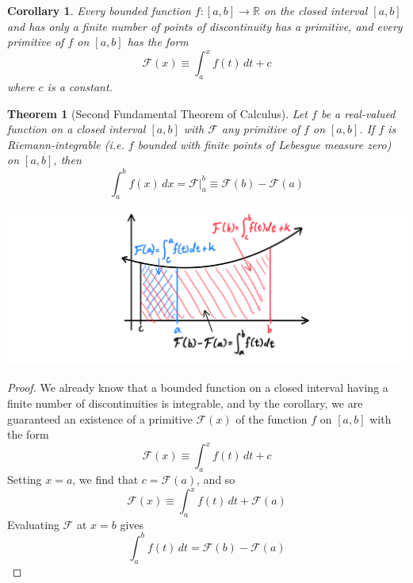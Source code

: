 \documentclass{article}
\newtheorem{theorem}{Theorem}[section]
\newtheorem{corollary}{Corollary}[theorem]
\theoremstyle{remark}
\theoremstyle{definition}
\begin{document}
\begin{corollary}
Every bounded function $f: [a, b] \longrightarrow \mathbb{R}$ on the closed interval $[a, b]$ and has only a finite number of points of discontinuity has a primitive, and every primitive of $f$ on $[a, b]$ has the form 
\[\mathcal{F}(x) \equiv \int_a^x f(t)\,dt + c\]
where $c$ is a constant. 
\end{corollary}

\begin{theorem}[Second Fundamental Theorem of Calculus]
Let $f$ be a real-valued function on a closed interval $[a, b]$ with $\mathcal{F}$ any primitive of $f$ on $[a, b]$. If $f$ is Riemann-integrable (i.e. $f$ bounded with finite points of Lebesgue measure zero) on $[a, b]$, then 
\[\int_a^b f(x)\,dx  = \mathcal{F} \big|_a^b \equiv \mathcal{F}(b) - \mathcal{F}(a)\]
\begin{center}
    \includegraphics[scale=0.3]{img/Second_Fundamental_Theorem_Analysis.PNG}
\end{center}
\end{theorem}
\begin{proof}
We already know that a bounded function on a closed interval having a finite number of discontinuities is integrable, and by the corollary, we are guaranteed an existence of a primitive $\mathcal{F}(x)$ of the function $f$ on $[a, b]$ with the form 
\[\mathcal{F} (x) \equiv \int_a^x f(t)\,dt + c\]
Setting $x = a$, we find that $c = \mathcal{F}(a)$, and so 
\[\mathcal{F}(x) \equiv \int_a^x f(t)\,dt + \mathcal{F}(a)\]
Evaluating $\mathcal{F}$ at $x = b$ gives
\[\int_a^b f(t)\,dt = \mathcal{F}(b) - \mathcal{F}(a)\]
\end{proof}
\end{document}
